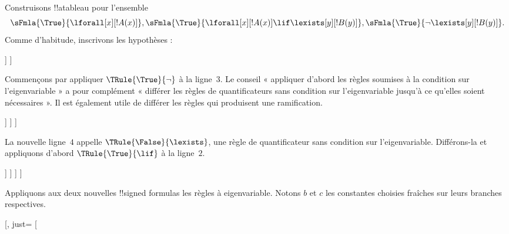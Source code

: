 \documentclass[../../../include/open-logic-section]{subfiles}
\begin{document}
\begin{ex}
Construisons !!a{tableau} pour l'ensemble
\[
\sFmla{\True}{\lforall[x][!A(x)]}, \sFmla{\True}{\lforall[x][!A(x)] 
  \lif \lexists[y][!B(y)]}, \sFmla{\True}{\lnot\lexists[y][!B(y)]}.
\]
Comme d'habitude, inscrivons les hypothèses :
\begin{oltableau}
  [\sFmla{\True}{\lforall[x][\formula{A}(x)]}, just=\TAss
    [\sFmla{\True}{\lforall[x][\formula{A}(x)] \lif
        \lexists[y][\formula{B}(y)]}, just=\TAss
      [\sFmla{\True}{\lnot\lexists[y][\formula{B}(y)]}, just=\TAss
      ]
    ]
  ]
\end{oltableau}
Commençons par appliquer $\TRule{\True}{\lnot}$ à la ligne~$3$. Le
conseil « appliquer d'abord les règles soumises à la condition sur
l'eigenvariable » a pour complément « différer les règles de
quantificateurs sans condition sur l'eigenvariable jusqu'à ce qu'elles
soient nécessaires ». Il est également utile de différer les règles
qui produisent une ramification.
\begin{oltableau}
  [\sFmla{\True}{\lforall[x][\formula{A}(x)]}, just=\TAss
    [\sFmla{\True}{\lforall[x][\formula{A}(x)] \lif
        \lexists[y][\formula{B}(y)]}, just=\TAss
      [\sFmla{\True}{\lnot\lexists[y][\formula{B}(y)]}, just=\TAss, checked
        [\sFmla{\False}{\lexists[y][\formula{B}(y)]}, just={\TRule{\True}{\lnot}[3]}]
      ]
    ]
  ]
\end{oltableau}
La nouvelle ligne~$4$ appelle $\TRule{\False}{\lexists}$, une règle de
quantificateur sans condition sur l'eigenvariable. Différons-la et
appliquons d'abord $\TRule{\True}{\lif}$ à la ligne~$2$.
\begin{oltableau}
  [\sFmla{\True}{\lforall[x][\formula{A}(x)]}, just=\TAss
    [\sFmla{\True}{\lforall[x][\formula{A}(x)] \lif
        \lexists[y][\formula{B}(y)]}, just=\TAss, checked
      [\sFmla{\True}{\lnot\lexists[y][\formula{B}(y)]}, just=\TAss, checked
        [\sFmla{\False}{\lexists[y][\formula{B}(y)]},
          just={\TRule{\True}{\lnot}[3]},
          [\sFmla{\False}{\lforall[x][\formula{A}(x)]}, just={\TRule{\True}{\lif}[2]}]
          [\sFmla{\True}{\lexists[y][\formula{B}(y)]}, just={\TRule{\True}{\lif}[2]}]
        ]
      ]
    ]
  ]
\end{oltableau}
Appliquons aux deux nouvelles !!{signed formula}s les règles à eigenvariable.
Notons $b$ et $c$ les constantes choisies fraîches sur leurs branches respectives.
\begin{oltableau}
  [\sFmla{\True}{\lforall[x][\formula{A}(x)]}, just=\TAss
    [\sFmla{\True}{\lforall[x][\formula{A}(x)] \lif
}
\end{oltableau}
\end{ex}
\end{document}
